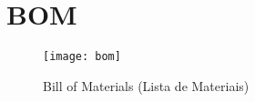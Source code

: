 \documentclass[../monografia.tex]{subfiles}
\begin{document}
\chapter{BOM}
\begin{figure}[h]
\centering
    \texttt{[image: bom]}
    \label{fig:img1}
    \caption{Bill of Materials (Lista de Materiais)}
\end{figure}
\end{document}

